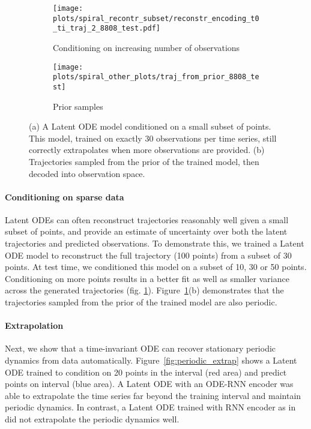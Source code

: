 \documentclass{article}
\begin{document}
\begin{figure}[b]
	\centering
\hspace{0cm}\begin{subfigure}[b]{0.70\columnwidth}
	\centering
	\texttt{[image: plots/spiral\_recontr\_subset/reconstr\_encoding\_t0\_ti\_traj\_2\_8808\_test.pdf]}
	\caption{Conditioning on increasing number of observations}
	\end{subfigure}
\begin{subfigure}[b]{0.29\columnwidth}
	\centering
	\vspace{8mm}
	\texttt{[image: plots/spiral\_other\_plots/traj\_from\_prior\_8808\_test]}
	\caption{Prior samples}
	\end{subfigure}
\caption{(a) A Latent ODE model conditioned on a small subset of points. 
	This model, trained on exactly 30 observations per time series, still correctly extrapolates when more observations are provided.
	(b) Trajectories sampled from the prior  of the trained model, then decoded into observation space.}
	\label{fig:cond_on_subset}
\end{figure}

\paragraph{Conditioning on sparse data}
Latent ODEs can often reconstruct trajectories reasonably well given a small subset of points, and provide an estimate of uncertainty over both the latent trajectories and predicted observations.
To demonstrate this, we trained a Latent ODE model to reconstruct the full trajectory (100 points) from a subset of 30 points.
At test time, we conditioned this model on a subset of 10, 30 or 50 points.
Conditioning on more points results in a better fit as well as smaller variance across the generated trajectories (fig. \ref{fig:cond_on_subset}).
Figure~\ref{fig:cond_on_subset}(b) demonstrates that the trajectories sampled from the prior of the trained model are also periodic.







\paragraph{Extrapolation}
Next, we show that a time-invariant ODE can recover stationary periodic dynamics from data automatically.
Figure~\ref{fig:periodic_extrap} shows a Latent ODE trained to condition on 20 points in the  interval (red area) and predict points on  interval (blue area).
A Latent ODE with an ODE-RNN encoder was able to extrapolate the time series far beyond the training interval and maintain periodic dynamics.
In contrast, a Latent ODE trained with RNN encoder as in \citet{NeuralODE} did not extrapolate the periodic dynamics well.
\end{document}

